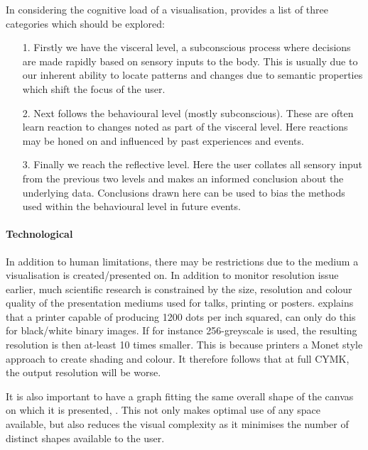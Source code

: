 In considering the cognitive load of a visualisation, \cite{emotional} provides a list of three categories which should be explored:


\begin{itemize}
\item[1.] Firstly we have the visceral level, a subconscious process where decisions are made rapidly based on sensory inputs to the body. 
This is usually due to our inherent ability to locate patterns and changes due to semantic properties which shift the focus of the user.  

\item[2.] Next follows the behavioural level (mostly subconscious). These are often learn reaction to changes noted as part of the visceral level. Here reactions may be honed on and influenced by past experiences and events. 

\item[3.] Finally we reach the reflective level. Here the user collates all sensory input from the previous two levels and makes an informed conclusion about the underlying data. Conclusions drawn here can be used to bias the methods used within the behavioural level in future events. 
\end{itemize}

\paragraph*{Technological}
In addition to human limitations, there may be restrictions due to the medium a visualisation is created/presented on. In addition to monitor resolution issue earlier, much scientific research is constrained by the size, resolution and colour quality of the presentation mediums used for talks, printing or posters. \cite{ware} explains that a printer capable of producing 1200 dots per inch squared, can only do this for black/white binary images. If for instance 256-greyscale is used, the resulting resolution is then at-least 10 times smaller. This is because printers a Monet style approach to create shading and colour. It therefore follows that at full CYMK, the output resolution will be worse. 

It is also important to have a graph fitting the same overall shape of the canvas on which it is presented, \cite{graphmetnew}. This not only makes optimal use of any space available, but also reduces the visual complexity as it minimises the number of distinct shapes available to the user. 




